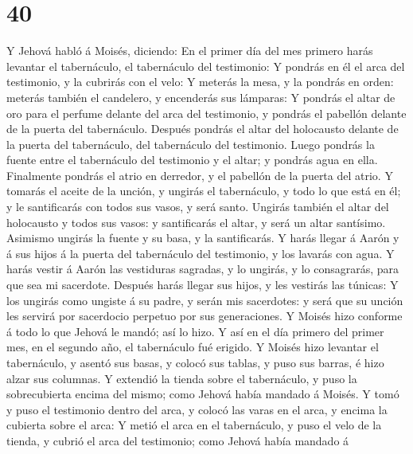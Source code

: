 \hypertarget{section-39}{%
\section{40}\label{section-39}}

 Y Jehová habló á Moisés, diciendo:  En el
primer día del mes primero harás levantar el tabernáculo, el tabernáculo
del testimonio:  Y pondrás en él el arca del testimonio, y
la cubrirás con el velo:  Y meterás la mesa, y la pondrás
en orden: meterás también el candelero, y encenderás sus lámparas:
 Y pondrás el altar de oro para el perfume delante del
arca del testimonio, y pondrás el pabellón delante de la puerta del
tabernáculo.  Después pondrás el altar del holocausto
delante de la puerta del tabernáculo, del tabernáculo del testimonio.
 Luego pondrás la fuente entre el tabernáculo del
testimonio y el altar; y pondrás agua en ella.  Finalmente
pondrás el atrio en derredor, y el pabellón de la puerta del atrio.
 Y tomarás el aceite de la unción, y ungirás el
tabernáculo, y todo lo que está en él; y le santificarás con todos sus
vasos, y será santo.  Ungirás también el altar del
holocausto y todos sus vasos: y santificarás el altar, y será un altar
santísimo.  Asimismo ungirás la fuente y su basa, y la
santificarás.  Y harás llegar á Aarón y á sus hijos á la
puerta del tabernáculo del testimonio, y los lavarás con agua.
 Y harás vestir á Aarón las vestiduras sagradas, y lo
ungirás, y lo consagrarás, para que sea mi sacerdote. 
Después harás llegar sus hijos, y les vestirás las túnicas:
 Y los ungirás como ungiste á su padre, y serán mis
sacerdotes: y será que su unción les servirá por sacerdocio perpetuo por
sus generaciones.  Y Moisés hizo conforme á todo lo que
Jehová le mandó; así lo hizo.  Y así en el día primero
del primer mes, en el segundo año, el tabernáculo fué erigido.
 Y Moisés hizo levantar el tabernáculo, y asentó sus
basas, y colocó sus tablas, y puso sus barras, é hizo alzar sus
columnas.  Y extendió la tienda sobre el tabernáculo, y
puso la sobrecubierta encima del mismo; como Jehová había mandado á
Moisés.  Y tomó y puso el testimonio dentro del arca, y
colocó las varas en el arca, y encima la cubierta sobre el arca:
 Y metió el arca en el tabernáculo, y puso el velo de la
tienda, y cubrió el arca del testimonio; como Jehová había mandado á
